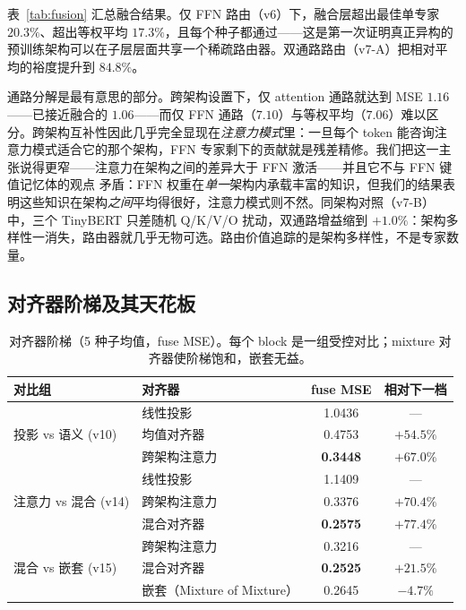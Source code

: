 \documentclass[10pt,twoside]{article}
\begin{document}
表~\ref{tab:fusion} 汇总融合结果。仅 FFN 路由（v6）下，融合层超出最佳单专家 $20.3\%$、超出等权平均 $17.3\%$，且每个种子都通过——这是第一次证明真正异构的预训练架构可以在子层层面共享一个稀疏路由器。双通路路由（v7-A）把相对平均的裕度提升到 $84.8\%$。

通路分解是最有意思的部分。跨架构设置下，仅 attention 通路就达到 MSE $1.16$——已接近融合的 $1.06$——而仅 FFN 通路（$7.10$）与等权平均（$7.06$）难以区分。跨架构互补性因此几乎完全显现在\emph{注意力模式}里：一旦每个 token 能咨询注意力模式适合它的那个架构，FFN 专家剩下的贡献就是残差精修。我们把这一主张说得更窄——注意力在架构之间的差异大于 FFN 激活——并且它不与 FFN 键值记忆体的观点 \citep{geva2021,meng2022,dai2022} 矛盾：FFN 权重在\emph{单一}架构内承载丰富的知识，但我们的结果表明这些知识在架构\emph{之间}平均得很好，注意力模式则不然。同架构对照（v7-B）中，三个 TinyBERT 只差随机 Q/K/V/O 扰动，双通路增益缩到 $+1.0\%$：架构多样性一消失，路由器就几乎无物可选。路由价值追踪的是架构多样性，不是专家数量。

\subsection{对齐器阶梯及其天花板}
\label{sec:align-exp}

\begin{table}[t]
\centering
\caption{对齐器阶梯（5 种子均值，fuse MSE）。每个 block 是一组受控对比；mixture 对齐器使阶梯饱和，嵌套无益。}
\label{tab:ladder}
\begin{tabular}{llcc}
\toprule
\textbf{对比组} & \textbf{对齐器} & \textbf{fuse MSE} & \textbf{相对下一档} \\
\midrule
\multirow{3}{*}{投影 vs 语义 (v10)}
 & 线性投影 & 1.0436 & --- \\
 & 均值对齐器 & 0.4753 & $+54.5\%$ \\
 & 跨架构注意力 & \textbf{0.3448} & $+67.0\%$ \\
\midrule
\multirow{3}{*}{注意力 vs 混合 (v14)}
 & 线性投影 & 1.1409 & --- \\
 & 跨架构注意力 & 0.3376 & $+70.4\%$ \\
 & 混合对齐器 & \textbf{0.2575} & $+77.4\%$ \\
\midrule
\multirow{3}{*}{混合 vs 嵌套 (v15)}
 & 跨架构注意力 & 0.3216 & --- \\
 & 混合对齐器 & \textbf{0.2525} & $+21.5\%$ \\
 & 嵌套（Mixture of Mixture） & 0.2645 & $-4.7\%$ \\
\bottomrule
\end{tabular}
\end{table}
\end{document}
